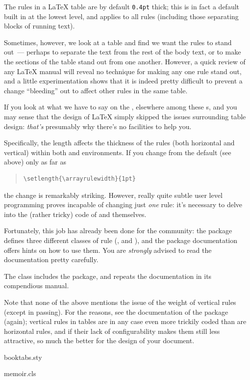 
The rules in a \LaTeX{} table are by default \texttt{0.4pt} thick;
this is in fact a default built in at the lowest level, and applies to
all rules (including those separating blocks of running text).

Sometimes, however, we look at a table and find we want the rules to
stand out~--- perhaps to separate the text from the rest of the body
text, or to make the sections of the table stand out from one another.
However, a quick review of any \LaTeX{} manual will reveal no
technique for making any one rule stand out, and a little
experimentation shows that it is indeed pretty difficult to prevent
a change ``bleeding'' out to affect other rules in the same table.

If you look at what we have to say on the %
, elsewhere
among these s, and you may sense that the design of \LaTeX{}
simply skipped the issues surrounding table design: \emph{that's}
presumably why there's no facilities to help you.

Specifically, the length  affects the thickness of
the rules (both horizontal and vertical) within both
 and  environments.  If you
change from the default (see above) only as far as
\begin{quote}
\begin{verbatim}
\setlength{\arrayrulewidth}{1pt}
\end{verbatim}
\end{quote}
the change is remarkably striking.  However, really quite subtle user
level programming proves incapable of changing just \emph{one} rule:
it's necessary to delve into the (rather tricky) code of 
and  themselves.

Fortunately, this job has already been done for the community: the
 package defines three different classes of rule
(,  and ), and the package
documentation offers hints on how to use them.  You are
\emph{strongly} advised to read the documentation pretty carefully.

The  class includes the  package, and
repeats the documentation in its compendious manual.

Note that none of the above mentions the issue of the weight of
vertical rules (except in passing).  For the reasons, see the
documentation of the  package (again); vertical
rules in tables are in any case even more trickily coded than are
horizontal rules, and if their lack of configurability makes them
still less attractive, so much the better for the design of your
document.
\begin{ctanrefs}
\item[booktabs.sty]
\item[memoir.cls]
\end{ctanrefs}

